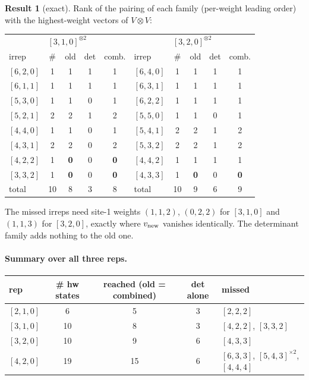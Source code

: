 \documentclass[11pt]{article}
\theoremstyle{definition}
\newtheorem{result}{Result}
\theoremstyle{remark}
\begin{document}
\begin{result}[exact]\label{res:hw}
Rank of the pairing of each family (per-weight leading order) with the highest-weight vectors of $V\otimes V$:
\begin{center}
\begin{tabular}{lcccc@{\qquad}lcccc}\toprule
\multicolumn{5}{c}{$[3,1,0]^{\otimes2}$} & \multicolumn{5}{c}{$[3,2,0]^{\otimes2}$}\\
irrep & \# & old & det & comb. & irrep & \# & old & det & comb.\\\midrule
$[6,2,0]$ & 1 & 1 & 1 & 1 & $[6,4,0]$ & 1 & 1 & 1 & 1\\
$[6,1,1]$ & 1 & 1 & 1 & 1 & $[6,3,1]$ & 1 & 1 & 1 & 1\\
$[5,3,0]$ & 1 & 1 & 0 & 1 & $[6,2,2]$ & 1 & 1 & 1 & 1\\
$[5,2,1]$ & 2 & 2 & 1 & 2 & $[5,5,0]$ & 1 & 1 & 0 & 1\\
$[4,4,0]$ & 1 & 1 & 0 & 1 & $[5,4,1]$ & 2 & 2 & 1 & 2\\
$[4,3,1]$ & 2 & 2 & 0 & 2 & $[5,3,2]$ & 2 & 2 & 1 & 2\\
$[4,2,2]$ & 1 & \textbf{0} & 0 & \textbf{0} & $[4,4,2]$ & 1 & 1 & 1 & 1\\
$[3,3,2]$ & 1 & \textbf{0} & 0 & \textbf{0} & $[4,3,3]$ & 1 & \textbf{0} & 0 & \textbf{0}\\\midrule
total & 10 & 8 & 3 & 8 & total & 10 & 9 & 6 & 9\\\bottomrule
\end{tabular}
\end{center}
The missed irreps need site-1 weights $(1,1,2)$, $(0,2,2)$ for $[3,1,0]$ and $(1,1,3)$ for $[3,2,0]$, exactly where $v_{\rm new}$ vanishes identically. The determinant family adds nothing to the old one.
\end{result}

\paragraph{Summary over all three reps.}
\begin{center}
\begin{tabular}{lcccl}\toprule
rep & \# hw states & reached (old = combined) & det alone & missed\\\midrule
$[2,1,0]$ & 6 & 5 & 3 & $[2,2,2]$\\
$[3,1,0]$ & 10 & 8 & 3 & $[4,2,2]$, $[3,3,2]$\\
$[3,2,0]$ & 10 & 9 & 6 & $[4,3,3]$\\
$[4,2,0]$ & 19 & 15 & 6 & $[6,3,3]$, $[5,4,3]^{\times2}$, $[4,4,4]$\\\bottomrule
\end{tabular}
\end{center}
\end{document}
